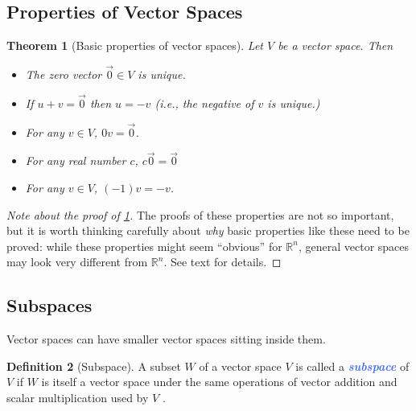 \documentclass[10pt]{article}
\newcommand{\demph}[1]{\textcolor{RoyalBlue}{\textbf{\slshape #1}}} %
\newtheorem{theorem}{Theorem}
\theoremstyle{definition}
\newtheorem{definition}[theorem]{Definition}
\newcommand{\R}{\mathbb{R}}           %
\begin{document}
\subsection{Properties of Vector Spaces}

\begin{theorem}[Basic properties of vector spaces]
  \label{thm:basic-properties-vector-spaces}
  Let $V$ be a vector space. Then
  \begin{itemize}
    \item The zero vector $\vec{0}\in V$ is unique.
    \item If $u+v=\vec{0}$ then $u=-v$ (i.e., the negative of $v$ is unique.)
    \item For any $v\in V$, $0 v=\vec{0}$.
    \item For any real number $c$, $c\vec{0}=\vec{0}$
    \item For any $v\in V$, $(-1)v=-v$.
  \end{itemize}
\end{theorem}
\begin{proof}[Note about the proof of
  \cref{thm:basic-properties-vector-spaces}]
  The proofs of these properties are not so important, but it is worth
  thinking carefully about \textit{why} basic properties like these need to be
  proved: while these properties might seem ``obvious'' for $\R^{n}$, general
  vector spaces may look very different from $\R^{n}$. See text for details.
\end{proof}


\subsection{Subspaces}
Vector spaces can have smaller vector spaces sitting inside them.

\begin{definition}[Subspace]
  \label{def:subspace}
  A subset $W$ of a vector space $V$ is called a \demph{subspace} of $V$ if
  $W$ is itself a vector space under the same operations of vector addition
  and scalar multiplication used by $V$ .
\end{definition}
\end{document}
